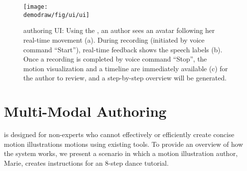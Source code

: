 
\begin{figure*}[!th]
  \centering
  \texttt{[image: \\demodraw/fig/ui/ui]}
  \caption{\systemname{} authoring UI: Using the \phaseI{}, an author sees an avatar following her real-time movement (a). During recording (initiated by voice command ``Start''), real-time feedback shows the speech labels (b). Once a recording is completed by voice command ``Stop'', the motion visualization and a timeline are immediately available (c) for the author to review, and a step-by-step overview will be generated.}
  \label{fig:DemoDrawUI}
\end{figure*}

\clearpage

\section{Multi-Modal Authoring}

\systemname{} is designed for non-experts who cannot effectively or efficiently create concise motion illustrations motions using existing tools.
To provide an overview of how the system works, we present a scenario in which a motion illustration author, Marie, creates instructions for an 8-step dance tutorial.

